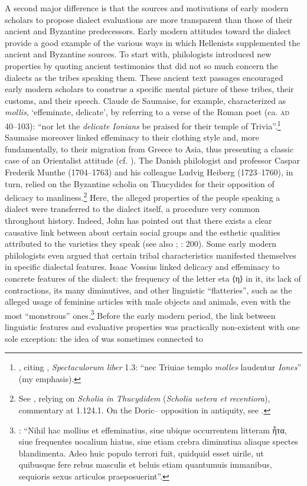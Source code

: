 A second major difference is that the sources and motivations of early modern scholars to propose dialect evaluations are more transparent than those of their ancient and Byzantine predecessors. Early modern attitudes toward the  dialect provide a good example of the various ways in which Hellenists supplemented the ancient and Byzantine sources. To start with, philologists introduced new properties by quoting ancient testimonies that did not so much concern the dialects as the tribes speaking them. These ancient text passages encouraged early modern scholars to construe a specific mental picture of these tribes, their customs, and their speech. Claude de Saumaise, for example, characterized  as \textit{mollis}, ‘effeminate, delicate’, by referring to a verse of the Roman poet  (ca. \textsc{ad} 40–103): “nor let the \textit{delicate Ionians} be praised for their temple of Trivia”.\footnote{\citet[75]{Saumaise1643a}, citing , \textit{Spectaculorum liber} 1.3: “nec Triuiae templo \textit{molles} laudentur \textit{Iones}” (my emphasis).} Saumaise moreover linked  effeminacy to their clothing style and, more fundamentally, to their migration from Greece to Asia, thus presenting a classic case of an Orientalist attitude (cf. \citealt{Said2003}). The Danish philologist and professor Caspar Frederik Munthe (1704–1763) and his colleague Ludvig Heiberg (1723–1760), in turn, relied on the Byzantine scholia on Thucydides for their opposition of  delicacy to  manliness.\footnote{See \citet[15]{Munthe1748}, relying on \textit{Scholia in Thucydidem} (\textit{Scholia uetera et recentiora}), commentary at 1.124.1. On the Doric– opposition in antiquity, see \citet{Cassio1984}.} Here, the alleged properties of the people speaking a dialect were transferred to the dialect itself, a procedure very common throughout history. Indeed, John \citet[66--68]{Edwards2009} has pointed out that there exists a clear causative link between  about certain social groups and the esthetic qualities attributed to the varieties they speak (see also \citealt{Silverstein2003}; \citealt{Preston2018}: 200). Some early modern philologists even argued that certain tribal characteristics manifested themselves in specific dialectal features. Isaac Vossius linked  delicacy and effeminacy to concrete features of the dialect: the frequency of the letter eta ⟨η⟩ in it, its lack of contractions, its many diminutives, and other linguistic “flatteries”, such as the alleged usage of feminine articles with male objects and animals, even with the most “monstrous” ones.\footnote{\citet[55]{Vossius1673}: “Nihil hac mollius et effeminatius, siue ubique occurrentem litteram ἦτα, siue frequentes uocalium hiatus, siue etiam crebra diminutiua aliaque spectes blandimenta. Adeo huic populo terrori fuit, quidquid esset uirile, ut quibusque fere rebus masculis et beluis etiam quantumuis immanibus, sequioris sexus articulos praeposuerint”.} Before the early modern period, the link between linguistic features and evaluative properties was practically non-existent with one sole exception: the idea of   was sometimes connected to 